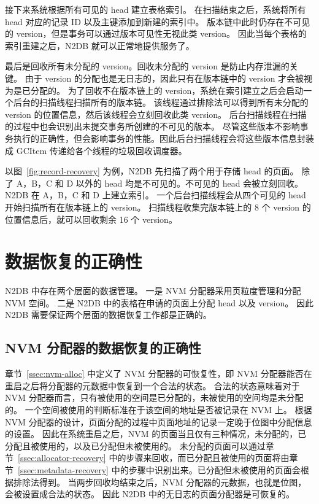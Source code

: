 接下来系统根据所有可见的 head 建立表格索引。
在扫描结束之后，系统将所有 head 对应的记录 ID 以及主键添加到新建的索引中。
版本链中此时仍存在不可见的 version，但是事务可以通过版本可见性无视此类 version。
因此当每个表格的索引重建之后，N2DB 就可以正常地提供服务了。

最后是回收所有未分配的 version。回收未分配的 version 是防止内存泄漏的关键。
由于 version 的分配也是无日志的，因此只有在版本链中的 version 才会被视为是已分配的。
为了回收不在版本链上的 version，系统在索引建立之后会启动一个后台的扫描线程扫描所有的版本链。
该线程通过排除法可以得到所有未分配的 version 的位置信息，然后该线程会立刻回收此类 version。
后台扫描线程在扫描的过程中也会识别出未提交事务所创建的不可见的版本。
尽管这些版本不影响事务执行的正确性，但会影响事务的性能。因此后台扫描线程会将这些版本信息封装成 GCItem 传递给各个线程的垃圾回收调度器。

以图~\ref{fig:record-recovery} 为例，N2DB 先扫描了两个用于存储 head 的页面。
除了 A，B，C 和 D 以外的 head 均是不可见的。不可见的 head 会被立刻回收。
N2DB 在 A，B，C 和 D 上建立索引。
一个后台扫描线程会从四个可见的 head 开始扫描所有在版本链上的 version。
扫描线程收集完版本链上的 8 个 version 的位置信息后，就可以回收剩余 16 个 version。

\section{数据恢复的正确性}

N2DB 中存在两个层面的数据管理。
一是 NVM 分配器采用页粒度管理和分配 NVM 空间。
二是 N2DB 中的表格在申请的页面上分配 head 以及 version。
因此 N2DB 需要保证两个层面的数据恢复工作都是正确的。

\subsection{NVM 分配器的数据恢复的正确性}

章节~\ref{ssec:nvm-alloc} 中定义了 NVM 分配器的可恢复性，即 NVM 分配器能否在重启之后将分配器的元数据中恢复到一个合法的状态。
合法的状态意味着对于 NVM 分配器而言，只有被使用的空间是已分配的，未被使用的空间均是未分配的。
一个空间被使用的判断标准在于该空间的地址是否被记录在 NVM 上。
根据 NVM 分配器的设计，页面分配的过程中页面地址的记录一定晚于位图中分配信息的设置。
因此在系统重启之后，NVM 的页面当且仅有三种情况，未分配的，已分配且被使用的，以及已分配但未被使用的。
未分配的页面可以通过章节~\ref{ssec:allocator-recovery} 中的步骤来回收，而已分配且被使用的页面将由章节~\ref{ssec:metadata-recovery} 中的步骤中识别出来。已分配但未被使用的页面会根据排除法得到。
当两步回收均结束之后，NVM 分配器的元数据，也就是位图，会被设置成合法的状态。
因此 N2DB 中的无日志的页面分配器是可恢复的。

